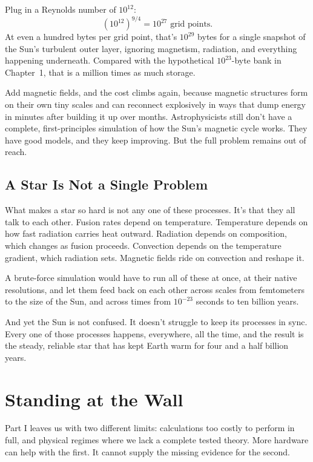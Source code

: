 \begin{examplebox}
Plug in a Reynolds number of \(10^{12}\):
\[
\left(10^{12}\right)^{9/4} = 10^{27} \text{ grid points.}
\]
At even a hundred bytes per grid point, that's \(10^{29}\) bytes for a single snapshot of the Sun's turbulent outer layer, ignoring magnetism, radiation, and everything happening underneath. Compared with the hypothetical \(10^{23}\)-byte bank in Chapter~1, that is a million times as much storage.
\end{examplebox}

Add magnetic fields, and the cost climbs again, because magnetic structures form on their own tiny scales and can reconnect explosively in ways that dump energy in minutes after building it up over months. Astrophysicists still don't have a complete, first-principles simulation of how the Sun's magnetic cycle works. They have good models, and they keep improving. But the full problem remains out of reach.

\subsection{A Star Is Not a Single Problem}

What makes a star so hard is not any one of these processes. It's that they all talk to each other. Fusion rates depend on temperature. Temperature depends on how fast radiation carries heat outward. Radiation depends on composition, which changes as fusion proceeds. Convection depends on the temperature gradient, which radiation sets. Magnetic fields ride on convection and reshape it.

A brute-force simulation would have to run all of these at once, at their native resolutions, and let them feed back on each other across scales from femtometers to the size of the Sun, and across times from \(10^{-23}\) seconds to ten billion years.

And yet the Sun is not confused. It doesn't struggle to keep its processes in sync. Every one of those processes happens, everywhere, all the time, and the result is the steady, reliable star that has kept Earth warm for four and a half billion years.

\section{Standing at the Wall}

Part I leaves us with two different limits: calculations too costly to perform in full, and physical regimes where we lack a complete tested theory. More hardware can help with the first. It cannot supply the missing evidence for the second.

